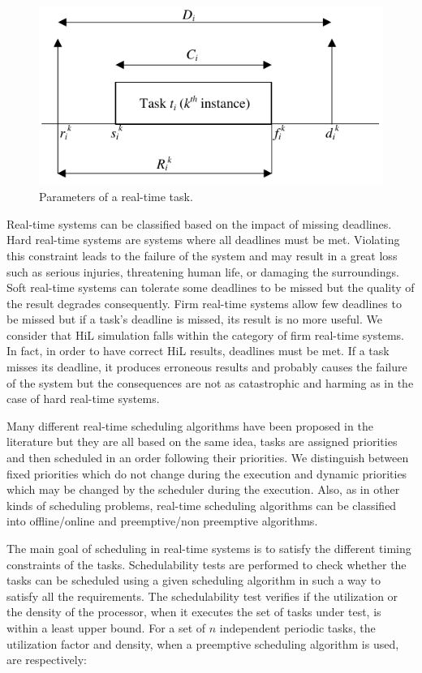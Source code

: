 \begin{figure}[h]
\centering
\captionsetup{justification=centering}
\includegraphics{figures/taskmodel}
\caption{Parameters of a real-time task.}
\label{fig:taskmodel}
\end{figure} 

Real-time systems can be classified based on the impact of missing deadlines. Hard real-time systems are systems where all deadlines must be met. Violating this constraint leads to the failure of the system and may result in a great loss such as serious injuries, threatening human life, or damaging the surroundings. Soft real-time systems can tolerate some deadlines to be missed but the quality of the result degrades consequently. Firm real-time systems allow few deadlines to be missed but if a task's deadline is missed, its result is no more useful. We consider that HiL simulation falls within the category of firm real-time systems. In fact, in order to have correct HiL results, deadlines must be met. If a task misses its deadline, it produces erroneous results and probably causes the failure of the system but the consequences are not as catastrophic and harming as in the case of hard real-time systems.   

Many different real-time scheduling algorithms have been proposed in the literature but they are all based on the same idea, tasks are assigned priorities and then scheduled in an order following their priorities. We distinguish between fixed priorities which do not change during the execution and dynamic priorities which may be changed by the scheduler during the execution. Also, as in other kinds of scheduling problems, real-time scheduling algorithms can be classified into offline/online and preemptive/non preemptive algorithms.

The main goal of scheduling in real-time systems is to satisfy the different timing constraints of the tasks. Schedulability tests are performed to check whether the tasks can be scheduled using a given scheduling algorithm in such a way to satisfy all the requirements. The schedulability test verifies if the utilization or the density of the processor, when it executes the set of tasks under test, is within a least upper bound. For a set of $n$ independent periodic tasks, the utilization factor and density, when a preemptive scheduling algorithm is used, are respectively:

